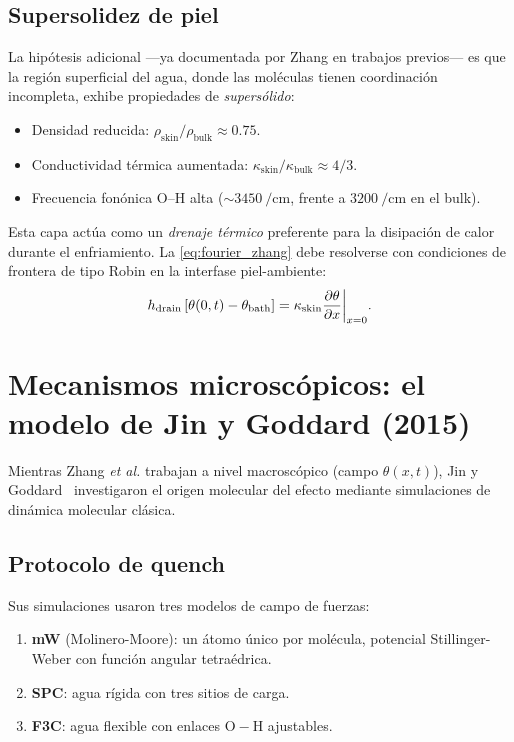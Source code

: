 \subsection{Supersolidez de piel}

La hipótesis adicional ---ya documentada por Zhang en trabajos previos--- es que 
la región superficial del agua, donde las moléculas tienen coordinación 
incompleta, exhibe propiedades de \emph{supersólido}: 

\begin{itemize}
\item Densidad reducida: $\rho_{\mathrm{skin}}/\rho_{\mathrm{bulk}} \approx 0.75$.
\item Conductividad térmica aumentada: $\kappa_{\mathrm{skin}}/\kappa_{\mathrm{bulk}} \approx 4/3$.
\item Frecuencia fonónica O--H alta ($\sim \SI{3450}{\per\centi\meter}$, frente a 
$\SI{3200}{\per\centi\meter}$ en el bulk).
\end{itemize}

\noindent Esta capa actúa como un \emph{drenaje térmico} preferente para la 
disipación de calor durante el enfriamiento. La \cref{eq:fourier_zhang} debe 
resolverse con condiciones de frontera de tipo Robin en la interfase 
piel-ambiente:
\begin{equation}
    h_{\mathrm{drain}} \left[\theta(0,t) - \theta_{\mathrm{bath}}\right] 
    = \kappa_{\mathrm{skin}} \pdv{\theta}{x}\bigg|_{x=0}.
    \label{eq:robin_bc}
\end{equation}

\section{Mecanismos microscópicos: el modelo de Jin y Goddard (2015)}

Mientras Zhang \emph{et al.} trabajan a nivel macroscópico (campo $\theta(x,t)$), 
Jin y Goddard~\cite{jin_goddard2015} investigaron el origen molecular del efecto 
mediante simulaciones de dinámica molecular clásica.

\subsection{Protocolo de quench}

Sus simulaciones usaron tres modelos de campo de fuerzas:
\begin{enumerate}
\item \textbf{mW} (Molinero-Moore): un átomo único por molécula, potencial 
Stillinger-Weber con función angular tetraédrica.
\item \textbf{SPC}: agua rígida con tres sitios de carga.
\item \textbf{F3C}: agua flexible con enlaces $\mathrm{O{-}H}$ ajustables.
\end{enumerate}

